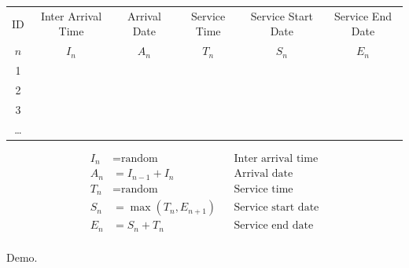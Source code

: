 \documentclass{beamer}
\begin{document}
\begin{frame}
    \tiny
    \begin{center}
        \begin{tabular}{cccccc}
            \toprule
            ID       & Inter Arrival Time & Arrival Date & Service Time & Service Start Date & Service End Date\\
            \(n\)    & \(I_n\)            & \(A_n\)      & \(T_n\)      & \(S_n\)            & \(E_n\)\\
            \midrule
            1        &                    &              &              &                    & \\
            2        &                    &              &              &                    & \\
            3        &                    &              &              &                    & \\
            \dots    &                    &              &              &                    & \\
            \bottomrule
        \end{tabular}
    \end{center}
\end{frame}


\begin{frame}
    \begin{align*}
        I_n &= \text{random}  && \text{Inter arrival time}\\
        A_n &= I_{n-1} + I_n  && \text{Arrival date}\\
        T_n &= \text{random}  && \text{Service time}\\
        S_n &= \max(T_n, E_{n + 1}) && \text{Service start date}\\
        E_n &= S_n + T_n && \text{Service end date}\\
    \end{align*}
\end{frame}

\begin{frame}
    \Huge
    \begin{center}
        Demo.
    \end{center}
\end{frame}
\end{document}
